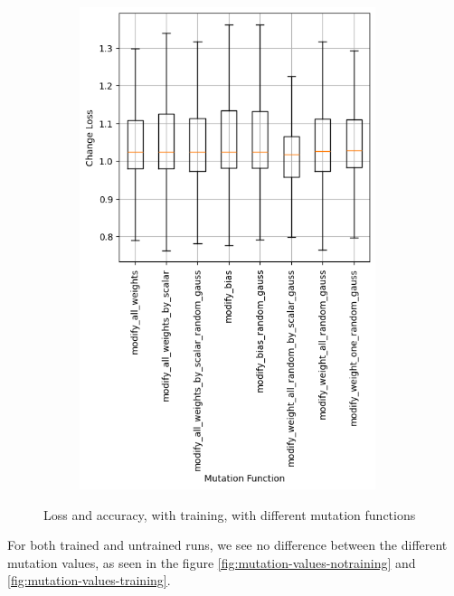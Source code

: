 \begin{figure}
\begin{subfigure}{0.5\textwidth}
        \includegraphics[width=0.95\textwidth]{plots/Mutatation_Trained_loss.png}
    \end{subfigure}
    \caption{Loss and accuracy, with training, with different mutation functions}
    \label{fig:mutation-functions-training}
\end{figure}
For both trained and untrained runs, we see no difference between the different mutation values, as seen in the figure \ref{fig:mutation-values-notraining} and \ref{fig:mutation-values-training}.
